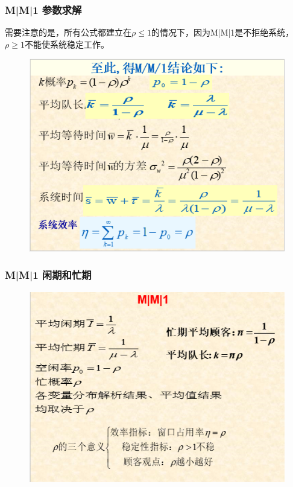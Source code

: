 \subsubsection{M|M|1 参数求解}
需要注意的是，所有公式都建立在$ \rho \le 1 $的情况下，因为M|M|1是不拒绝系统，$ \rho \ge 1 $不能使系统稳定工作。
\begin{figure}[H]
	\centering
	\includegraphics[width=0.5\linewidth]{figures/prove_5}
	\caption{}
	\label{fig:prove5}
\end{figure}
\subsubsection{M|M|1 闲期和忙期}
\begin{figure}[H]
	\centering
	\includegraphics[width=0.5\linewidth]{figures/prove_6}
	\caption{}
	\label{fig:prove6}
\end{figure}
